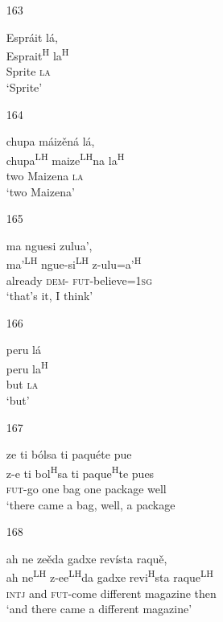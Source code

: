\begin{itemize}
\item[163]
 
\glll   Espr\'{a}it l\'{a},\\
 Esprait\textsuperscript{H} la\textsuperscript{H}\\
Sprite \textsc{la}\\
\glt `Sprite'
 


\item[164]
 
\glll   chupa m\'{a}iz\v{e}n\'{a} l\'{a},\\
chupa\textsuperscript{LH} maize\textsuperscript{LH}na la\textsuperscript{H}\\
two Maizena \textsc{la}\\
\glt `two Maizena'
 


\item[165]
 
\glll   ma nguesi zulua',\\
 ma'\textsuperscript{LH} ngue-si\textsuperscript{LH}  z-ulu=a'\textsuperscript{H}\\
already \textsc{dem}- \textsc{fut}-believe=\textsc{1sg}\\
\glt `that's it, I think'
 


\item[166]
 
\glll   peru l\'{a}\\
peru la\textsuperscript{H}\\
but \textsc{la}\\
\glt `but'
 


\item[167]
 
\glll  ze ti b\'{o}lsa ti paqu\'{e}te pue\\
z-e ti bol\textsuperscript{H}sa ti paque\textsuperscript{H}te pues\\
\textsc{fut}-go one bag one package well \\
\glt `there came a bag, well, a package
 



\item[168]
 
\glll   ah ne ze\v{e}da gadxe rev\'{i}sta raqu\v{e}, \\
ah ne\textsuperscript{LH} z-ee\textsuperscript{LH}da gadxe revi\textsuperscript{H}sta raque\textsuperscript{LH}\\
\textsc{intj} and \textsc{fut}-come different magazine then\\
\glt `and there came a different magazine'
 



\end{itemize}
